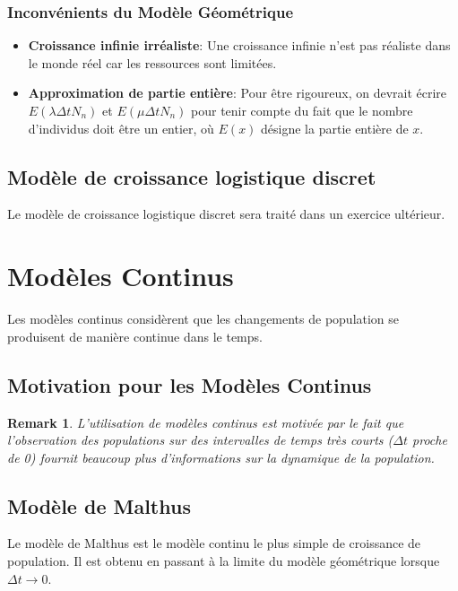 \documentclass{article}
\newtheorem{remark}{Remark}
\begin{document}
\subsubsection{Inconvénients du Modèle Géométrique}

\begin{itemize}
    \item \textbf{Croissance infinie irréaliste}: Une croissance infinie n'est pas réaliste dans le monde réel car les ressources sont limitées.
    \item \textbf{Approximation de partie entière}: Pour être rigoureux, on devrait écrire $E(\lambda \Delta t N_n)$ et $E(\mu \Delta t N_n)$ pour tenir compte du fait que le nombre d'individus doit être un entier, où $E(x)$ désigne la partie entière de $x$.
\end{itemize}

\subsection{Modèle de croissance logistique discret}
Le modèle de croissance logistique discret sera traité dans un exercice ultérieur.

\section{Modèles Continus}

Les modèles continus considèrent que les changements de population se produisent de manière continue dans le temps.

\subsection{Motivation pour les Modèles Continus}

\begin{remark}
L'utilisation de modèles continus est motivée par le fait que l'observation des populations sur des intervalles de temps très courts ($\Delta t$ proche de 0) fournit beaucoup plus d'informations sur la dynamique de la population.
\end{remark}


\subsection{Modèle de Malthus}

Le modèle de Malthus est le modèle continu le plus simple de croissance de population. Il est obtenu en passant à la limite du modèle géométrique lorsque $\Delta t \to 0$.
\end{document}
